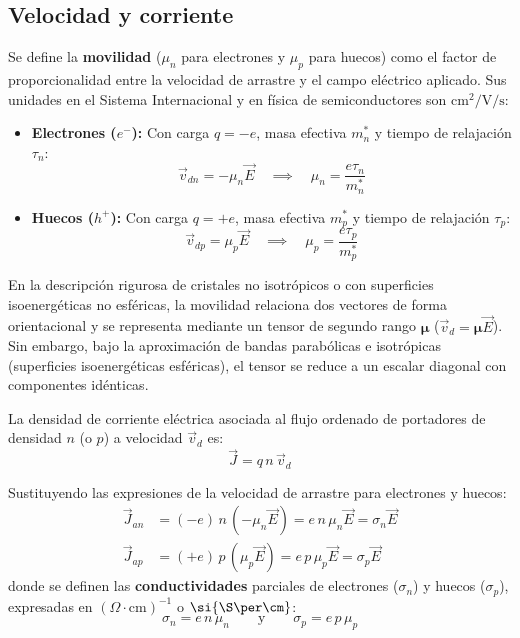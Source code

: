 \newpage
\subsection{Velocidad y corriente}

Se define la \textbf{movilidad} ($\mu_n$ para electrones y $\mu_p$ para huecos) como el factor de proporcionalidad entre la velocidad de arrastre y el campo eléctrico aplicado. Sus unidades en el Sistema Internacional y en física de semiconductores son $\si{\cm^2\per\volt\per\second}$:

\begin{itemize}
    \item \textbf{Electrones ($e^-$):} Con carga $q = -e$, masa efectiva $m_n^*$ y tiempo de relajación $\tau_n$:
    \[
    \vec{v}_{dn} = -\mu_n \vec{E} \quad \implies \quad \mu_n = \frac{e \tau_n}{m_n^*}
    \]
    \item \textbf{Huecos ($h^+$):} Con carga $q = +e$, masa efectiva $m_p^*$ y tiempo de relajación $\tau_p$:
    \[
    \vec{v}_{dp} = \mu_p \vec{E} \quad \implies \quad \mu_p = \frac{e \tau_p}{m_p^*}
    \]
\end{itemize}

\begin{concepto}
En la descripción rigurosa de cristales no isotrópicos o con superficies isoenergéticas no esféricas, la movilidad relaciona dos vectores de forma orientacional y se representa mediante un tensor de segundo rango $\boldsymbol{\mu}$ ($\vec{v}_d = \boldsymbol{\mu} \vec{E}$). Sin embargo, bajo la aproximación de bandas parabólicas e isotrópicas (superficies isoenergéticas esféricas), el tensor se reduce a un escalar diagonal con componentes idénticas.
\end{concepto}

La densidad de corriente eléctrica asociada al flujo ordenado de portadores de densidad $n$ (o $p$) a velocidad $\vec{v}_d$ es:
\[
\vec{J} = q \, n \, \vec{v}_d
\]

Sustituyendo las expresiones de la velocidad de arrastre para electrones y huecos:
\begin{align*}
\vec{J}_{an} &= (-e) \, n \, (-\mu_n \vec{E}) = e \, n \, \mu_n \vec{E} = \sigma_n \vec{E} \\
\vec{J}_{ap} &= (+e) \, p \, (\mu_p \vec{E}) = e \, p \, \mu_p \vec{E} = \sigma_p \vec{E}
\end{align*}
donde se definen las \textbf{conductividades} parciales de electrones ($\sigma_n$) y huecos ($\sigma_p$), expresadas en $(\Omega \cdot \si{\cm})^{-1}$ o $\si{\S\per\cm}$:
\[
\sigma_n = e \, n \, \mu_n \qquad \text{y} \qquad \sigma_p = e \, p \, \mu_p
\]

